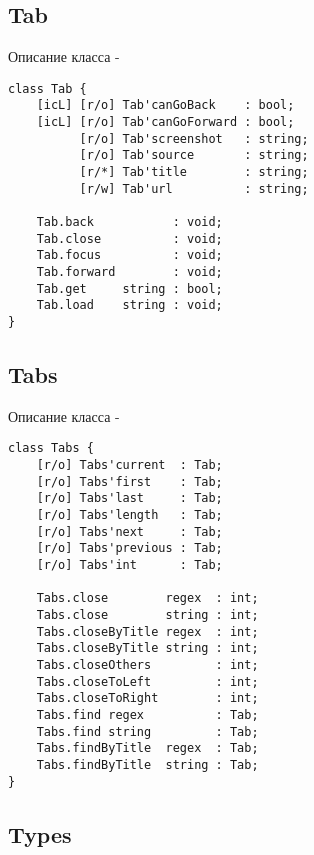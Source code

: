 \subsection{{\color{orange} Tab}}

\noindent Описание класса  -
\begin{lstlisting}[numbers=none]
class Tab {
    [icL] [r/o] Tab'canGoBack    : bool;
	[icL] [r/o] Tab'canGoForward : bool;
	      [r/o] Tab'screenshot   : string;
	      [r/o] Tab'source       : string;
	      [r/*] Tab'title        : string;
	      [r/w] Tab'url          : string;

    Tab.back           : void;
	Tab.close          : void;
	Tab.focus          : void;
	Tab.forward        : void;
	Tab.get     string : bool;
	Tab.load    string : void;
}
\end{lstlisting}

\subsection{{\color{orange} Tabs}}

\noindent Описание класса  -
\begin{lstlisting}[numbers=none]
class Tabs {
    [r/o] Tabs'current  : Tab;
	[r/o] Tabs'first    : Tab;
	[r/o] Tabs'last     : Tab;
	[r/o] Tabs'length   : Tab;
	[r/o] Tabs'next     : Tab;
	[r/o] Tabs'previous : Tab;
	[r/o] Tabs'int      : Tab;
	
    Tabs.close        regex  : int;
	Tabs.close        string : int;
	Tabs.closeByTitle regex  : int;
	Tabs.closeByTitle string : int;
	Tabs.closeOthers         : int;
	Tabs.closeToLeft         : int;
	Tabs.closeToRight        : int;
	Tabs.find regex          : Tab;
	Tabs.find string         : Tab;
	Tabs.findByTitle  regex  : Tab;
	Tabs.findByTitle  string : Tab;
}
\end{lstlisting}

\subsection{{\color{orange} Types}}

